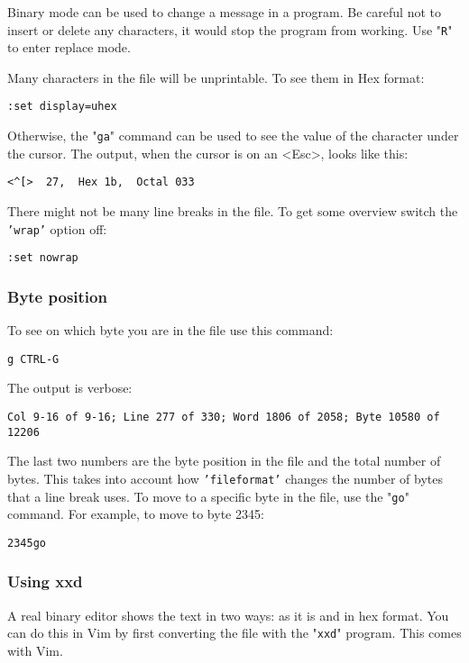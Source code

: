 Binary mode can be used to change a message in a program.
Be careful not to insert or delete any characters, it would stop the program from working.
Use "\texttt{R}" to enter replace mode.

Many characters in the file will be unprintable.
To see them in Hex format:

\begin{Verbatim}[samepage=true]
 :set display=uhex
\end{Verbatim}

Otherwise, the "\texttt{ga}" command can be used to see the value of the character under the cursor.
The output, when the cursor is on an <Esc>, looks like this:

\begin{Verbatim}[samepage=true]
    <^[>  27,  Hex 1b,  Octal 033 
\end{Verbatim}

There might not be many line breaks in the file.
To get some overview switch the \texttt{'wrap'} option off:

\begin{Verbatim}[samepage=true]
 :set nowrap
\end{Verbatim}

\subsubsection{Byte position}
To see on which byte you are in the file use this command:

\begin{Verbatim}[samepage=true]
 g CTRL-G
\end{Verbatim}

The output is verbose:

\begin{Verbatim}[samepage=true]
    Col 9-16 of 9-16; Line 277 of 330; Word 1806 of 2058; Byte 10580 of 12206 
\end{Verbatim}

The last two numbers are the byte position in the file and the total number of bytes.
This takes into account how \texttt{'fileformat'} changes the number of bytes that a line break uses.
To move to a specific byte in the file, use the "\texttt{go}" command.
For example, to move to byte 2345:

\begin{Verbatim}[samepage=true]
 2345go
\end{Verbatim}

\subsubsection{Using xxd}
A real binary editor shows the text in two ways: as it is and in hex format.
You can do this in Vim by first converting the file with the "\texttt{xxd}" program.
This comes with Vim.

